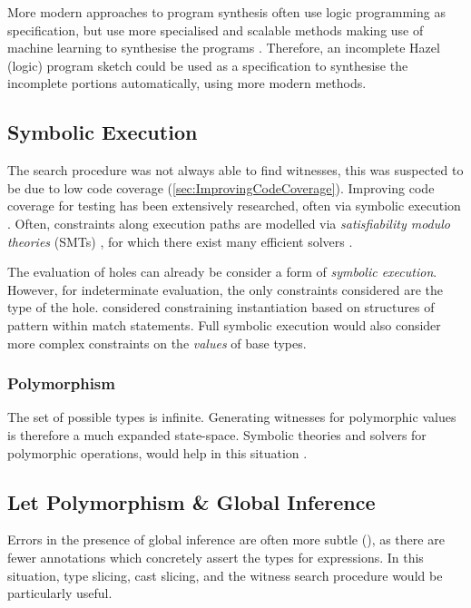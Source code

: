 More modern approaches to program synthesis often use logic programming as specification, but use more specialised and scalable methods making use of machine learning to synthesise the programs \cite{NeuralGuidedLogicProgramSynthesis, ProgramSynthesisSketching}. Therefore, an incomplete Hazel (logic) program sketch could be used as a specification to synthesise the incomplete portions automatically, using more modern methods.

\subsection{Symbolic Execution}
The search procedure was not always able to find witnesses, this was suspected to be due to low code coverage (\cref{sec:ImprovingCodeCoverage}). Improving code coverage for testing has been extensively researched, often via symbolic execution \cite{SymbolicExecutionSurvey}. Often, constraints along execution paths are modelled via \textit{satisfiability modulo theories} (SMTs) \cite{SMTs}, for which there exist many efficient solvers \cite{SMTSolver}.

The evaluation of holes can already be consider a form of \textit{symbolic execution}. However, for indeterminate evaluation, the only constraints considered are the type of the hole.  considered constraining instantiation based on structures of pattern within match statements. Full symbolic execution would also consider more complex constraints on the \textit{values} of base types.

\subsubsection{Polymorphism}
The set of possible types is infinite. Generating witnesses for polymorphic values is therefore a much expanded state-space. Symbolic theories and solvers for polymorphic operations, would help in this situation \cite{PolymorphicSMTs}.

\subsection{Let Polymorphism \& Global Inference}
Errors in the presence of global inference are often more subtle (\cite{SubtleOCamlErrors}), as there are fewer annotations which concretely assert the types for expressions. In this situation, type slicing, cast slicing, and the witness search procedure would be particularly useful.

